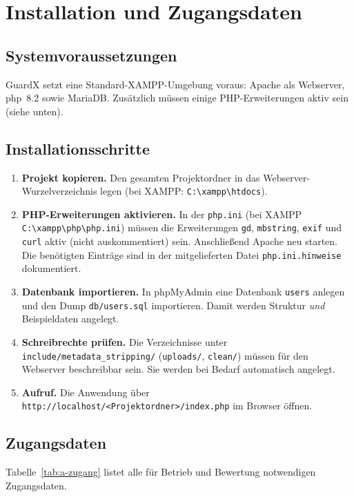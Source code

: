 \chapter{Installation und Zugangsdaten}
\label{ch:a-installation}

\section{Systemvoraussetzungen}
GuardX setzt eine Standard-XAMPP-Umgebung voraus: Apache als Webserver, \ac{php}~8.2 sowie
MariaDB. Zus\"atzlich m\"ussen einige PHP-Erweiterungen aktiv sein (siehe unten).

\section{Installationsschritte}
\begin{enumerate}
  \item \textbf{Projekt kopieren.} Den gesamten Projektordner in das Webserver-Wurzelverzeichnis
        legen (bei XAMPP: \texttt{C:\textbackslash\allowbreak xampp\textbackslash\allowbreak htdocs}).
  \item \textbf{PHP-Erweiterungen aktivieren.} In der \texttt{php.ini} (bei XAMPP
        \texttt{C:\textbackslash\allowbreak xampp\textbackslash\allowbreak php\textbackslash\allowbreak php.ini}) m\"ussen die
        Erweiterungen \texttt{gd}, \texttt{mbstring}, \texttt{exif} und \texttt{curl} aktiv (nicht
        auskommentiert) sein. Anschlie\ss{}end Apache neu starten. Die ben\"otigten Eintr\"age sind
        in der mitgelieferten Datei \texttt{php.ini.hinweise} dokumentiert.
  \item \textbf{Datenbank importieren.} In phpMyAdmin eine Datenbank \texttt{users} anlegen und den
        Dump \texttt{db/users.sql} importieren. Damit werden Struktur \emph{und} Beispieldaten
        angelegt.
  \item \textbf{Schreibrechte pr\"ufen.} Die Verzeichnisse unter
        \texttt{include/metadata\_stripping/} (\texttt{uploads/}, \texttt{clean/}) m\"ussen f\"ur
        den Webserver beschreibbar sein. Sie werden bei Bedarf automatisch angelegt.
  \item \textbf{Aufruf.} Die Anwendung \"uber \texttt{http://localhost/\allowbreak<Projektordner>/\allowbreak index.php}
        im Browser \"offnen.
\end{enumerate}

\enlargethispage{4\baselineskip}
\section{Zugangsdaten}
Tabelle~\ref{tab:a-zugang} listet alle f\"ur Betrieb und Bewertung notwendigen Zugangsdaten.

